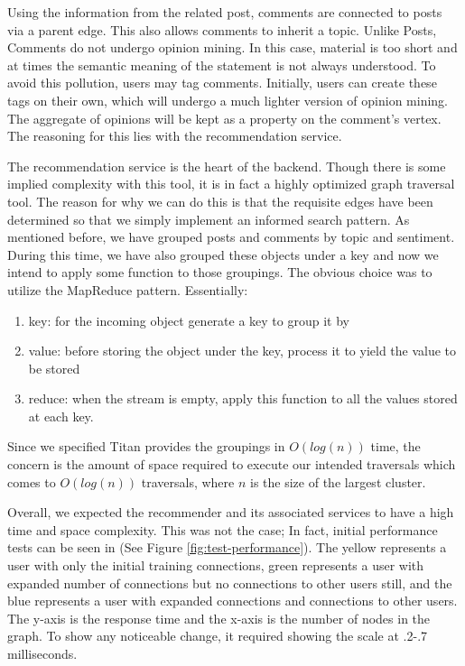 \documentclass[11pt,letterpaper]{article}
\begin{document}
Using the information from the related post, comments are connected to posts via a parent edge. This also allows comments to inherit a topic. Unlike Posts, Comments do not undergo opinion mining. In this case, material is too short and at times the semantic meaning of the statement is not always understood. To avoid this pollution, users may tag comments. Initially, users can create these tags on their own, which will undergo a much lighter version of opinion mining. The aggregate of opinions will be kept as a property on the comment's vertex. The reasoning for this lies with the recommendation service.

The recommendation service is the heart of the backend. Though there is some implied complexity with this tool, it is in fact a highly optimized graph traversal tool. The reason for why we can do this is that the requisite edges have been determined so that we simply implement an informed search pattern. As mentioned before, we have grouped posts and comments by topic and sentiment. During this time, we have also grouped these objects under a key and now we intend to apply some function to those groupings. The obvious choice was to utilize the MapReduce pattern. Essentially:
\begin{enumerate}
    \item key: for the incoming object generate a key to group it by
	\item value: before storing the object under the key, process it to yield the value to be stored
	\item reduce: when the stream is empty, apply this function to all the values stored at each key.
\end{enumerate} 
Since we specified Titan provides the groupings in $O(log(n))$ time, the concern is the amount of space required to execute our intended traversals which comes to $O(log(n))$ traversals, where $n$ is the size of the largest cluster.

Overall, we expected the recommender and its associated services to have a high time and space complexity. This was not the case; In fact, initial performance tests can be seen in (See Figure \ref{fig:test-performance}). The yellow represents a user with only the initial training connections, green represents a user with expanded number of connections but no connections to other users still, and the blue represents a user with expanded connections and connections to other users. The y-axis is the response time and the x-axis is the number of nodes in the graph. To show any noticeable change, it required showing the scale at .2-.7 milliseconds. 
\end{document}
